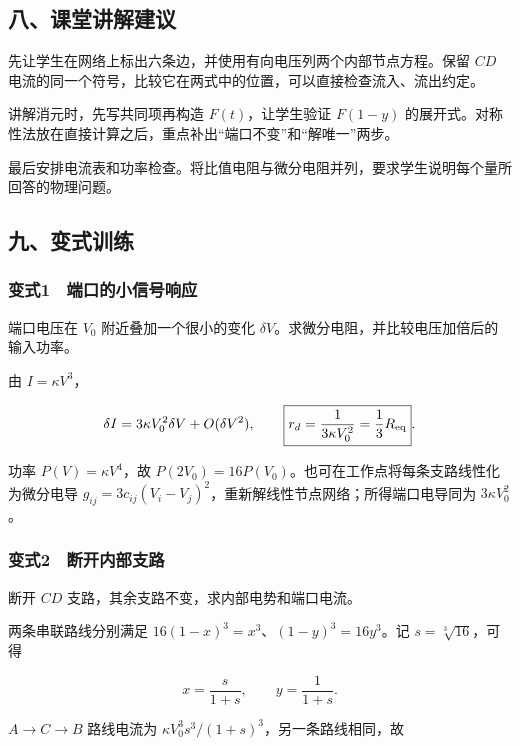 \documentclass[12pt,a4paper,fontset=fandol]{ctexart}
\begin{document}
\subsection{八、课堂讲解建议}\label{ux516bux8bfeux5802ux8bb2ux89e3ux5efaux8bae}

先让学生在网络上标出六条边，并使用有向电压列两个内部节点方程。保留
\(CD\)
电流的同一个符号，比较它在两式中的位置，可以直接检查流入、流出约定。

讲解消元时，先写共同项再构造 \(F(t)\)，让学生验证 \(F(1-y)\)
的展开式。对称性法放在直接计算之后，重点补出``端口不变''和``解唯一''两步。

最后安排电流表和功率检查。将比值电阻与微分电阻并列，要求学生说明每个量所回答的物理问题。

\subsection{九、变式训练}\label{ux4e5dux53d8ux5f0fux8badux7ec3}

\subsubsection{变式1　端口的小信号响应}\label{ux53d8ux5f0f1-ux7aefux53e3ux7684ux5c0fux4fe1ux53f7ux54cdux5e94}

端口电压在 \(V_0\) 附近叠加一个很小的变化
\(\delta V\)。求微分电阻，并比较电压加倍后的输入功率。

由 \(I=\kappa V^3\)，

\[
\delta I=3\kappa V_0^2\delta V+O(\delta V^2),\qquad
\boxed{r_d=\frac{1}{3\kappa V_0^2}=\frac13R_{\rm eq}}.
\]

功率 \(P(V)=\kappa V^4\)，故
\(P(2V_0)=16P(V_0)\)。也可在工作点将每条支路线性化为微分电导
\(g_{ij}=3c_{ij}(V_i-V_j)^2\)，重新解线性节点网络；所得端口电导同为
\(3\kappa V_0^2\)。

\subsubsection{变式2　断开内部支路}\label{ux53d8ux5f0f2-ux65adux5f00ux5185ux90e8ux652fux8def}

断开 \(CD\) 支路，其余支路不变，求内部电势和端口电流。

两条串联路线分别满足 \(16(1-x)^3=x^3\)、\((1-y)^3=16y^3\)。记
\(s=\sqrt[3]{16}\)，可得

\[
x=\frac{s}{1+s},\qquad y=\frac{1}{1+s}.
\]

\(A\to C\to B\) 路线电流为
\(\kappa V_0^3s^3/(1+s)^3\)，另一条路线相同，故
\end{document}
